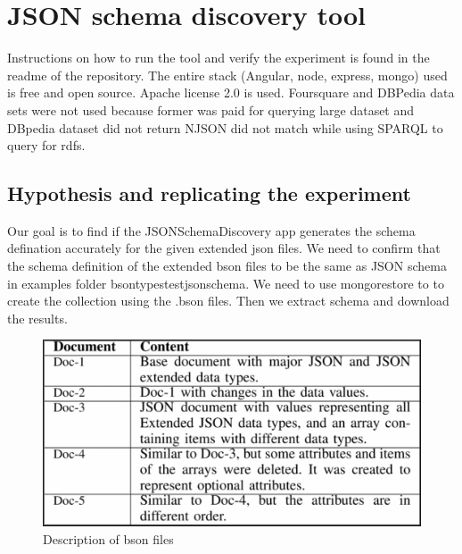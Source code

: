 \documentclass[sigconf, nonacm]{acmart}
\begin{document}
\section{JSON schema discovery tool}

Instructions on how to run the tool and verify the experiment is found in the readme of the repository. The entire stack (Angular, node, express, mongo) used is free and open source. Apache license 2.0 is used. Foursquare and DBPedia data sets were not used because former was paid for querying large dataset and DBpedia dataset did not return NJSON did not match while using SPARQL to query for rdfs.

\subsection{Hypothesis and replicating the experiment }

Our goal is to find if the JSONSchemaDiscovery app generates the schema defination accurately for the given extended json files. We need to confirm that the schema definition of the extended bson files to be the same as JSON schema in examples folder bsontypestestjsonschema. We need to use mongorestore to to create the collection using the .bson files. Then we extract schema and download the results.

\begin{figure}
  \centering
  \includegraphics[width=\linewidth]{figures/figure1.PNG}
  \caption{Description of bson files}
  \label{fig:BSON}
\end{figure}
\end{document}
